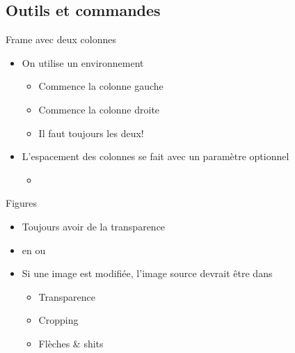 \subsection{Outils et commandes}
\begin{frame}{Frame avec deux colonnes}
    \begin{twocolumns}
        \leftcol
        \begin{itemize}
            \item On utilise un environnement 
            \begin{itemize}
                \item {} Commence la colonne gauche
                \item {} Commence la colonne droite
                \item Il faut toujours les deux!
            \end{itemize}
        \end{itemize}
        \rightcol
        \begin{itemize}
            \item L'espacement des colonnes se fait avec un paramètre optionnel
            \begin{itemize}
                \item {}
            \end{itemize}
        \end{itemize}
    \end{twocolumns}
\end{frame}

\begin{frame}{Figures}
    \begin{twocolumns}[0.4]
        \leftcol
        \begin{itemize}
            \item Toujours avoir de la transparence
            \item en  ou 
            \item Si une image est modifiée, l'image source devrait être dans 
            \begin{itemize}
                \item Transparence
                \item Cropping
                \item Flèches \& shits
            \end{itemize}
        \end{itemize}
        \rightcol
    \end{twocolumns}
\end{frame}

